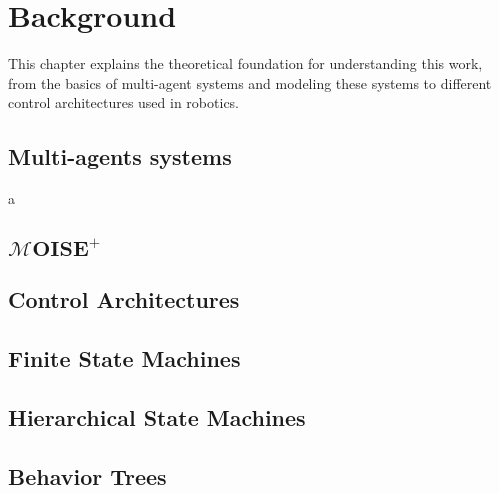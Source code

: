 \def \MOISEp {$\mathcal{M}OISE^+$} 
\def \MOISEpBf {$\mathbf{\mathcal{M}OISE^+}$} 

\chapter{Background}
\label{ch:background}

This chapter explains the theoretical foundation for understanding this work, from the basics of multi-agent systems and modeling these systems to different control architectures used in robotics.

\section{Multi-agents systems}

a

\section{\MOISEpBf}


\section{Control Architectures}



\section{Finite State Machines}

\section{Hierarchical State Machines}

\section{Behavior Trees}




